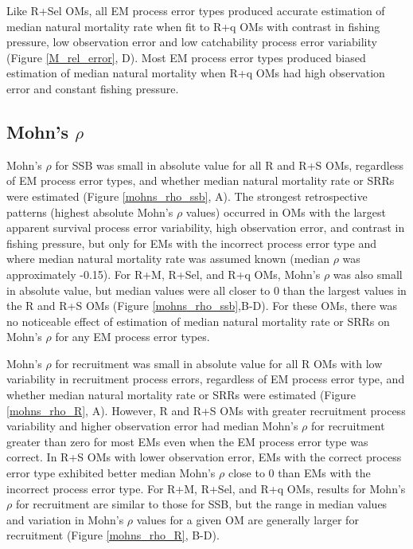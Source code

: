 \documentclass[
  12pt,
]{article}
\begin{document}
Like R+Sel OMs, all EM process error types produced accurate estimation
of median natural mortality rate when fit to R+q OMs with contrast in
fishing pressure, low observation error and low catchability process
error variability (Figure \ref{M_rel_error}, D). Most EM process error
types produced biased estimation of median natural mortality when R+q
OMs had high observation error and constant fishing pressure.

\hypertarget{mohns-rho-1}{%
\subsection*{\texorpdfstring{Mohn's
\(\rho\)}{Mohn's \textbackslash rho}}\label{mohns-rho-1}}

Mohn's \(\rho\) for SSB was small in absolute value for all R and R+S
OMs, regardless of EM process error types, and whether median natural
mortality rate or SRRs were estimated (Figure \ref{mohns_rho_ssb}, A).
The strongest retrospective patterns (highest absolute Mohn's \(\rho\)
values) occurred in OMs with the largest apparent survival process error
variability, high observation error, and contrast in fishing pressure,
but only for EMs with the incorrect process error type and where median
natural mortality rate was assumed known (median \(\rho\) was
approximately -0.15). For R+M, R+Sel, and R+q OMs, Mohn's \(\rho\) was
also small in absolute value, but median values were all closer to 0
than the largest values in the R and R+S OMs (Figure
\ref{mohns_rho_ssb},B-D). For these OMs, there was no noticeable effect
of estimation of median natural mortality rate or SRRs on Mohn's
\(\rho\) for any EM process error types.

Mohn's \(\rho\) for recruitment was small in absolute value for all R
OMs with low variability in recruitment process errors, regardless of EM
process error type, and whether median natural mortality rate or SRRs
were estimated (Figure \ref{mohns_rho_R}, A). However, R and R+S OMs
with greater recruitment process variability and higher observation
error had median Mohn's \(\rho\) for recruitment greater than zero for
most EMs even when the EM process error type was correct. In R+S OMs
with lower observation error, EMs with the correct process error type
exhibited better median Mohn's \(\rho\) close to 0 than EMs with the
incorrect process error type. For R+M, R+Sel, and R+q OMs, results for
Mohn's \(\rho\) for recruitment are similar to those for SSB, but the
range in median values and variation in Mohn's \(\rho\) values for a
given OM are generally larger for recruitment (Figure \ref{mohns_rho_R},
B-D).
\end{document}

